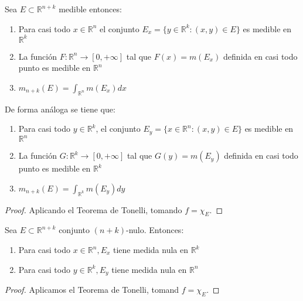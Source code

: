 \begin{corolario}
    Sea $E \subset \mathbb{R}^{n+k}$ medible entonces:
    \vspace{-0.5em}
    \begin{enumerate}
        \item Para casi todo $x \in \mathbb{R}^n$ el conjunto $E_x = \{ y \in \mathbb{R}^k :
                  (x, y) \in E \}$ es medible en $\mathbb{R}^k$
        \item La función $F: \mathbb{R}^n \to [0, +\infty]$ tal que $F(x) = m(E_x)$ definida
              en casi todo punto es medible en $\mathbb{R}^n$
        \item $m_{n+k}(E) = \int_{\mathbb{R}^n}m(E_x)dx$
    \end{enumerate}
    De forma análoga se tiene que:
    \vspace{-0.5em}
    \begin{enumerate}
        \item Para casi todo $y \in \mathbb{R}^k$, el conjunto $E_y = \{ x \in \mathbb{R}^n :
                  (x, y) \in E \}$ es medible en $\mathbb{R}^n$
        \item La función $G: \mathbb{R}^k \to [0, +\infty]$ tal que $G(y) = m(E_y)$ definida
              en casi todo punto es medible en $\mathbb{R}^k$
        \item $m_{n+k}(E) = \int_{\mathbb{R}^k}m(E_y)dy$
    \end{enumerate}
\end{corolario}
\begin{proof}
    Aplicando el Teorema de Tonelli, tomando $f = \chi_E$.
\end{proof}
\begin{corolario}
    Sea $E \subset \mathbb{R}^{n+k}$ conjunto $(n+k)$-nulo. Entonces:
    \vspace{-0.5em}
    \begin{enumerate}
        \item Para casi todo $x \in \mathbb{R}^n, E_x$ tiene medida nula en $\mathbb{R}^k$
        \item Para casi todo $y \in \mathbb{R}^k, E_y$ tiene medida nula en $\mathbb{R}^n$
    \end{enumerate}
\end{corolario}
\begin{proof}
    Aplicamos el Teorema de Tonelli, tomand $f = \chi_E$.
\end{proof}
